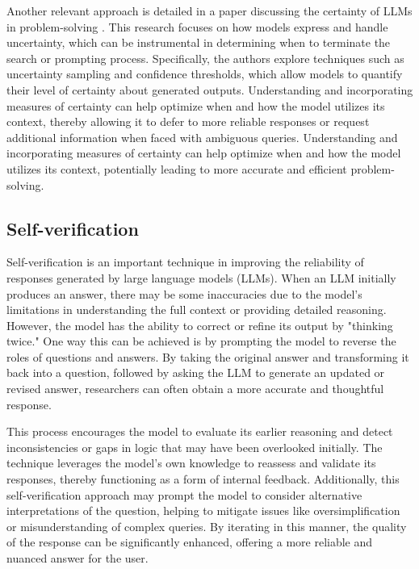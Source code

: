 \documentclass{article}
\begin{document}
Another relevant approach is detailed in a paper discussing the certainty of LLMs in problem-solving \cite{lin2022teachingmodelsexpressuncertainty}. This research focuses on how models express and handle uncertainty, which can be instrumental in determining when to terminate the search or prompting process. Specifically, the authors explore techniques such as uncertainty sampling and confidence thresholds, which allow models to quantify their level of certainty about generated outputs. Understanding and incorporating measures of certainty can help optimize when and how the model utilizes its context, thereby allowing it to defer to more reliable responses or request additional information when faced with ambiguous queries. Understanding and incorporating measures of certainty can help optimize when and how the model utilizes its context, potentially leading to more accurate and efficient problem-solving.

\subsection{Self-verification}

Self-verification \cite{weng2023largelanguagemodelsbetter} is an important technique in improving the reliability of responses generated by large language models (LLMs). When an LLM initially produces an answer, there may be some inaccuracies due to the model’s limitations in understanding the full context or providing detailed reasoning. However, the model has the ability to correct or refine its output by "thinking twice." One way this can be achieved is by prompting the model to reverse the roles of questions and answers. By taking the original answer and transforming it back into a question, followed by asking the LLM to generate an updated or revised answer, researchers can often obtain a more accurate and thoughtful response.

This process encourages the model to evaluate its earlier reasoning and detect inconsistencies or gaps in logic that may have been overlooked initially. The technique leverages the model’s own knowledge to reassess and validate its responses, thereby functioning as a form of internal feedback. Additionally, this self-verification approach may prompt the model to consider alternative interpretations of the question, helping to mitigate issues like oversimplification or misunderstanding of complex queries. By iterating in this manner, the quality of the response can be significantly enhanced, offering a more reliable and nuanced answer for the user.
\end{document}
